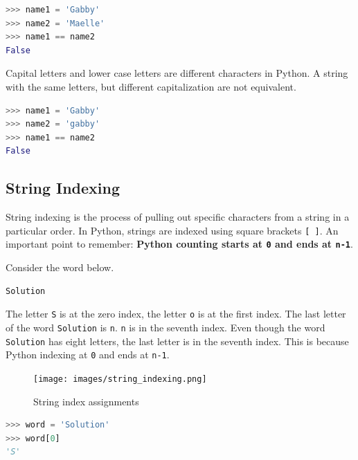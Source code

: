 \documentclass{book}
\begin{document}
\begin{lstlisting}[language=Python]
>>> name1 = 'Gabby'
>>> name2 = 'Maelle'
>>> name1 == name2
False
\end{lstlisting}

Capital letters and lower case letters are different characters in
Python. A string with the same letters, but different capitalization are
not equivalent.

\begin{lstlisting}[language=Python]
>>> name1 = 'Gabby'
>>> name2 = 'gabby'
>>> name1 == name2
False
\end{lstlisting}
    




    
        \subsection{String Indexing}\label{string-indexing}

String indexing is the process of pulling out specific characters from a
string in a particular order. In Python, strings are indexed using
square brackets \lstinline![ ]!. An important point to remember:
\textbf{Python counting starts at \lstinline!0! and ends at
\lstinline!n-1!}.

Consider the word below.

\begin{lstlisting}
Solution
\end{lstlisting}

The letter \lstinline!S! is at the zero index, the letter \lstinline!o!
is at the first index. The last letter of the word \lstinline!Solution!
is \lstinline!n!. \lstinline!n! is in the seventh index. Even though the
word \lstinline!Solution! has eight letters, the last letter is in the
seventh index. This is because Python indexing at \lstinline!0! and ends
at \lstinline!n-1!.

\begin{figure}
\centering
\texttt{[image: images/string\_indexing.png]}
\caption{String index assignments}
\end{figure}
    




    
        \begin{lstlisting}[language=Python]
>>> word = 'Solution'
>>> word[0]
'S'
\end{lstlisting}
    
\end{document}
